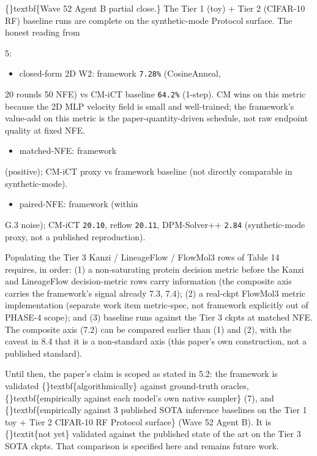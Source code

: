\documentclass{article}
\begin{document}
\{\}textbf\{Wave 52 Agent B partial close.\} The Tier 1 (toy) + Tier 2 (CIFAR-10 RF) baseline runs are complete on the synthetic-mode Protocol surface. The honest reading from

 5:

\begin{itemize}
\item {} closed-form 2D W2: framework \texttt{7.28\%} (CosineAnneal,
\end{itemize}
20 rounds  50 NFE) vs CM-iCT baseline \texttt{64.2\%} (1-step). CM wins on this metric because the 2D MLP velocity field is small and well-trained; the framework's value-add on this metric is the paper-quantity-driven  schedule, not raw endpoint quality at fixed NFE.

\begin{itemize}
\item {} matched-NFE: framework 
\end{itemize}
(positive); CM-iCT proxy  vs framework baseline (not directly comparable in synthetic-mode).

\begin{itemize}
\item {} paired-NFE: framework  (within
\end{itemize}
G.3 noise); CM-iCT \texttt{20.10}, reflow \texttt{20.11}, DPM-Solver++ \texttt{2.84} (synthetic-mode proxy, not a published reproduction).

Populating the Tier 3 Kanzi / LineageFlow / FlowMol3 rows of Table 14 requires, in order: (1) a non-saturating protein decision metric before the Kanzi and LineageFlow decision-metric rows carry information (the composite axis carries the framework's signal already  7.3, 7.4); (2) a real-ckpt FlowMol3 metric implementation (separate work item  metric-spec, not framework  explicitly out of PHASE-4 scope); and (3) baseline runs against the Tier 3 ckpts at matched NFE. The composite axis (7.2) can be compared earlier than (1) and (2), with the caveat in 8.4 that it is a non-standard axis (this paper's own construction, not a published standard).

Until then, the paper's claim is scoped as stated in 5.2: the framework is validated \{\}textbf\{algorithmically\} against ground-truth oracles, \{\}textbf\{empirically against each model's own native sampler\} (7), and \{\}textbf\{empirically against 3 published SOTA inference baselines on the Tier 1 toy + Tier 2 CIFAR-10 RF Protocol surface\} (Wave 52 Agent B). It is \{\}textit\{not yet\} validated against the published state of the art on the Tier 3 SOTA ckpts. That comparison is specified here and remains future work.
\end{document}
